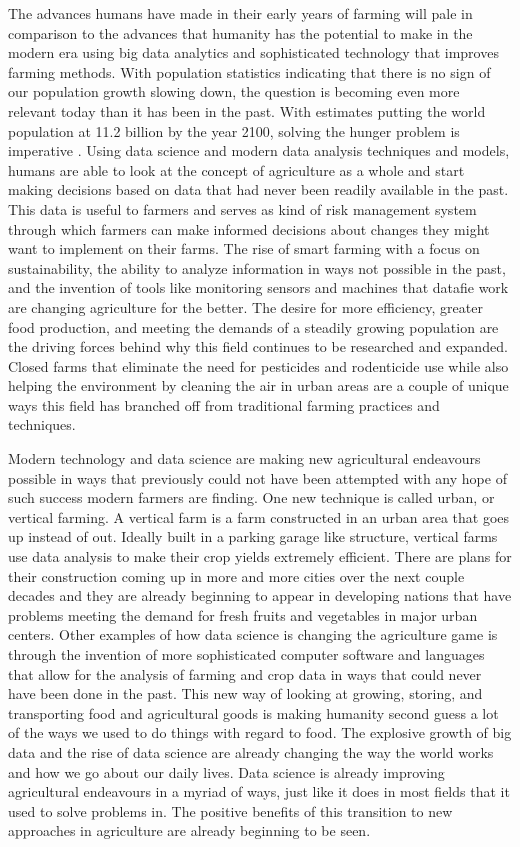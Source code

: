 \documentclass[sigconf]{acmart}
\begin{document}
The advances humans have made in their early years of farming will pale in comparison to the advances that humanity has the potential to make in the modern era using big data analytics and sophisticated technology that improves farming methods. With population statistics indicating that there is no sign of our population growth slowing down, the question is becoming even more relevant today than it has been in the past. With estimates putting the world population at 11.2 billion by the year 2100, solving the hunger problem is imperative \cite{green2005}. Using data science and modern data analysis techniques and models, humans are able to look at the concept of agriculture as a whole and start making decisions based on data that had never been readily available in the past. This data is useful to farmers and serves as kind of risk management system through which farmers can make informed decisions about changes they might want to implement on their farms. The rise of smart farming with a focus on sustainability, the ability to analyze information in ways not possible in the past, and the invention of tools like monitoring sensors and machines that datafie work are changing agriculture for the better. The desire for more efficiency, greater food production, and meeting the demands of a steadily growing population are the driving forces behind why this field continues to be researched and expanded. Closed farms that eliminate the need for pesticides and rodenticide use while also helping the environment by cleaning the air in urban areas are a couple of unique ways this field has branched off from traditional farming practices and techniques.

Modern technology and data science are making new agricultural endeavours possible in ways that previously could not have been attempted with any hope of such success modern farmers are finding. One new technique is called urban, or vertical farming. A vertical farm is a farm constructed in an urban area that goes up instead of out. Ideally built in a parking garage like structure, vertical farms use data analysis to make their crop yields extremely efficient. There are plans for their construction coming up in more and more cities over the next couple decades and they are already beginning to appear in developing nations that have problems meeting the demand for fresh fruits and vegetables in major urban centers. Other examples of how data science is changing the agriculture game is through the invention of more sophisticated computer software and languages that allow for the analysis of farming and crop data in ways that could never have been done in the past. This new way of looking at growing, storing, and transporting food and agricultural goods is making humanity second guess a lot of the ways we used to do things with regard to food. The explosive growth of big data and the rise of data science are already changing the way the world works and how we go about our daily lives. Data science is already improving agricultural endeavours in a myriad of ways, just like it does in most fields that it used to solve problems in. The positive benefits of this transition to new approaches in agriculture are already beginning to be seen.
\end{document}
